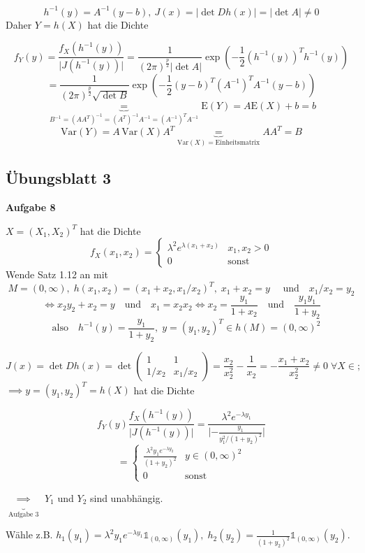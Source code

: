 \documentclass[12pt, a4paper]{article}
\newcommand{\E}{\mbox{I\negthinspace E}}
\theoremstyle{plain}
\theoremstyle{definition}
\newcommand{\1}{\mathds{1}}
\renewcommand{\E}{\mathrm{E}}
\newcommand{\Var}{\mathrm{Var}}
\providecommand{\abs}[1]{\lvert#1\rvert}
\providecommand{\mtext}[1]{\quad \text{#1} \quad}
\begin{document}
\[  h^{-1} (y) = A^{-1} (y-b), \: J(x) = \abs{\det Dh(x)} = \abs{\det A}  \neq 0    \]
Daher $Y = h(X)$ hat die Dichte

\[    f_Y (y) = \frac{f_X (h^{-1}(y))}{\abs{J(h^{-1} (y))}} = \frac{1}{(2\pi)^{\frac{p}{2}}\abs{\det A}} \exp (-\frac{1}{2} (h^{-1}(y))^T h^{-1}(y))   \]
\[    = \frac{1}{(2\pi)^{\frac{p}{2}}\sqrt{\det B}} \exp (-\frac{1}{2} (y-b)^T (A^{-1})^T A^{-1} (y-b)  )         \]
\[ \underbrace{=}_{B^{-1} = (AA^{T})^{-1} = (A^{T})^{-1} A^{-1} = (A^{-1})^T A^{-1}} \E(Y) = A\E(X) + b = b   \]
\[ \Var(Y) = A\,\Var(X)A^T \underbrace{=}_{\Var(X) = \text{Einheitsmatrix}} AA^T = B   \]

\newpage
\subsection{Übungsblatt 3} \textbf{Aufgabe 8}

$X = (X_1, X_2)^T$ hat die Dichte 
\[  f_X (x_1, x_2) = \begin{cases}  \lambda^2 e^{\lambda(x_1 + x_2)} & x_1, x_2 > 0 \\ 0 & \text{sonst} \end{cases}      \]
Wende Satz 1.12 an mit 
\[ M = (0, \infty), \; h(x_1, x_2) = (x_1 + x_2, x_1 / x_2)^T, \; x_1 + x_2 = y \mtext{ und} x_1 / x_2 = y_2     \]
\[ \iff x_2 y_2 + x_2 = y \mtext{und} x_1 = x_2 x_2 \iff x_2 = \frac{y_1}{1 + x_2} \mtext{und} \frac{y_1 y_1}{1 + y_2}     \]
\[ \mtext{also} h^{-1}(y) = \frac{y_1}{1 + y_2}, \; y = (y_1, y_2)^T \in h(M) = (0, \infty)^2     \]

\[  J(x) = \det Dh(x) = \det \begin{pmatrix}  1 & 1 \\ 1 / x_2 & x_1 / x_2   \end{pmatrix} =\frac{x_2}{x_2^2} - \frac{1}{x_2} = - \frac{x_1 + x_2}{x_2^2} \neq 0 \; \forall X \in ;\]
$  \implies y = (y_1, y_2)^T = h(X) $ hat die Dichte

\[  f_Y (y)  \frac{f_X (h^{-1}(y))}{\abs{J(h^{-1}(y))}} = \frac{\lambda^2 e^{-\lambda y_1}}{\abs{ - \frac{y_1}{y_1^2 / (1+y_2)^2}}}  \]
\[  = \begin{cases} \frac{\lambda^2 y_1 e^{-\lambda y_2}}{(1+y_2)^2} & y \in (0,\infty)^2 \\ 0 & \text{sonst} \end{cases}   \]

$ \underbrace{\implies}_{\text{Aufgabe 3}}$ $Y_1$ und $Y_2$ sind unabhängig.

Wähle z.B. $h_1(y_1) = \lambda^2 y_1 e^{-\lambda y_1} \1_{(0,\infty)}(y_1), \; h_2 (y_2) = \frac{1}{(1+y_2)^2} \1_{(0, \infty)} (y_2)$.
\end{document}
